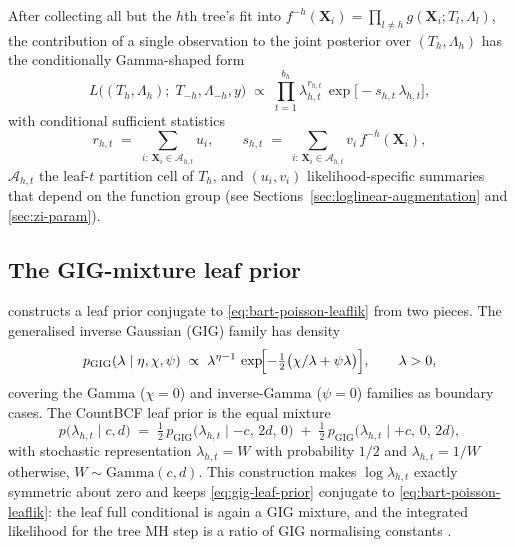 \documentclass[11pt]{article}
\theoremstyle{plain}
\theoremstyle{definition}
\theoremstyle{remark}
\newcommand{\Ga}{\mathrm{Gamma}}
\newcommand{\GIG}{\mathrm{GIG}}
\newcommand{\X}{\mathbf{X}}
\newcommand{\leafc}{c}
\newcommand{\leafd}{d}
\begin{document}
After collecting all but the $h$th tree's fit into
$f^{-h}(\X_i) = \prod_{l \neq h} g(\X_i; T_l, \Lambda_l)$, the
contribution of a single observation to the joint posterior over
$(T_h, \Lambda_h)$ has the conditionally Gamma-shaped form
\begin{equation}
  L\bigl((T_h, \Lambda_h);\; T_{-h}, \Lambda_{-h}, y\bigr)
  \;\propto\;
  \prod_{t=1}^{b_h}
    \lambda_{h,t}^{r_{h,t}}\,
    \exp\!\bigl[-s_{h,t}\, \lambda_{h,t}\bigr],
  \label{eq:bart-poisson-leaflik}
\end{equation}
with conditional sufficient statistics
\begin{equation}
  r_{h,t} \;=\; \sum_{i:\, \X_i \in \mathcal{A}_{h,t}} u_i,
  \qquad
  s_{h,t} \;=\; \sum_{i:\, \X_i \in \mathcal{A}_{h,t}} v_i\, f^{-h}(\X_i),
  \label{eq:bart-suffstats}
\end{equation}
$\mathcal{A}_{h,t}$ the leaf-$t$ partition cell of $T_h$, and
$(u_i, v_i)$ likelihood-specific summaries that depend on the function
group (see Sections~\ref{sec:loglinear-augmentation} and
\ref{sec:zi-param}).

\subsection{The GIG-mixture leaf prior}\label{sec:gig-leaf-prior}

\citet{murray2021loglinear} constructs a leaf prior conjugate to
\eqref{eq:bart-poisson-leaflik} from two pieces. The generalised
inverse Gaussian (GIG) family has density
\begin{equation}
  p_{\GIG}(\lambda \mid \eta, \chi, \psi)
  \;\propto\;
  \lambda^{\eta - 1}\,
  \exp\!\Bigl[-\tfrac{1}{2}\bigl(\chi / \lambda + \psi \lambda\bigr)\Bigr],
  \qquad \lambda > 0,
  \label{eq:gig-density}
\end{equation}
covering the Gamma ($\chi = 0$) and inverse-Gamma ($\psi = 0$)
families as boundary cases. The CountBCF leaf prior is the equal
mixture
\begin{equation}
  p\bigl(\lambda_{h,t} \mid \leafc, \leafd\bigr)
  \;=\;
  \tfrac{1}{2}\, p_{\GIG}\!\bigl(\lambda_{h,t} \mid -\leafc,\, 2\leafd,\, 0\bigr)
  \;+\;
  \tfrac{1}{2}\, p_{\GIG}\!\bigl(\lambda_{h,t} \mid +\leafc,\, 0,\, 2\leafd\bigr),
  \label{eq:gig-leaf-prior}
\end{equation}
with stochastic representation $\lambda_{h,t} = W$ with probability
$1/2$ and $\lambda_{h,t} = 1/W$ otherwise, $W \sim \Ga(\leafc,
\leafd)$. This construction makes $\log \lambda_{h,t}$ exactly
symmetric about zero and keeps \eqref{eq:gig-leaf-prior} conjugate to
\eqref{eq:bart-poisson-leaflik}: the leaf full conditional is again a
GIG mixture, and the integrated likelihood for the tree MH step is a
ratio of GIG normalising constants \citep[\S3.1]{murray2021loglinear}.
\end{document}
